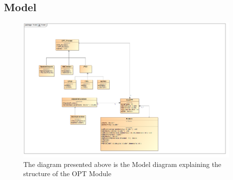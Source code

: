 \documentclass[11pt]{article}
\begin{document}
\subsection{Model}

\begin{figure}
\includegraphics[scale=0.45]{Model.png}
\caption{The diagram presented above is the Model diagram explaining the structure of the OPT Module}
\end{figure}
\end{document}
